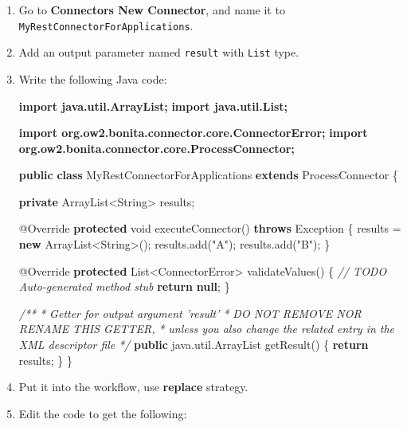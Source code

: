 \documentclass[]{report}
\newenvironment{Shaded}{}{}
\newcommand{\KeywordTok}[1]{\textcolor[rgb]{0.00,0.44,0.13}{\textbf{{#1}}}}
\newcommand{\DataTypeTok}[1]{\textcolor[rgb]{0.56,0.13,0.00}{{#1}}}
\newcommand{\StringTok}[1]{\textcolor[rgb]{0.25,0.44,0.63}{{#1}}}
\newcommand{\CommentTok}[1]{\textcolor[rgb]{0.38,0.63,0.69}{\textit{{#1}}}}
\newcommand{\FunctionTok}[1]{\textcolor[rgb]{0.02,0.16,0.49}{{#1}}}
\newcommand{\NormalTok}[1]{{#1}}
\begin{document}
\begin{enumerate}
\def\labelenumi{\arabic{enumi}.}
\item
  Go to \textbf{Connectors \textbar{} New Connector}, and name it to
  \texttt{MyRestConnectorForApplications}.
\item
  Add an output parameter named \texttt{result} with \texttt{List} type.
\item
  Write the following Java code:

\begin{Shaded}
\begin{Highlighting}[]
\KeywordTok{import java.util.ArrayList;}
\KeywordTok{import java.util.List;}

\KeywordTok{import org.ow2.bonita.connector.core.ConnectorError;}
\KeywordTok{import org.ow2.bonita.connector.core.ProcessConnector;}

\KeywordTok{public} \KeywordTok{class} \NormalTok{MyRestConnectorForApplications }\KeywordTok{extends} \NormalTok{ProcessConnector \{}

  \KeywordTok{private} \NormalTok{ArrayList<String> results;}

  \FunctionTok{@Override}
  \KeywordTok{protected} \DataTypeTok{void} \FunctionTok{executeConnector}\NormalTok{() }\KeywordTok{throws} \NormalTok{Exception \{}
    \NormalTok{results = }\KeywordTok{new} \NormalTok{ArrayList<String>();}
    \NormalTok{results.}\FunctionTok{add}\NormalTok{(}\StringTok{"A"}\NormalTok{);}
    \NormalTok{results.}\FunctionTok{add}\NormalTok{(}\StringTok{"B"}\NormalTok{);}
  \NormalTok{\}}

  \FunctionTok{@Override}
  \KeywordTok{protected} \NormalTok{List<ConnectorError> }\FunctionTok{validateValues}\NormalTok{() \{}
    \CommentTok{// TODO Auto-generated method stub}
    \KeywordTok{return} \KeywordTok{null}\NormalTok{;}
  \NormalTok{\}}

  \CommentTok{/**}
\CommentTok{   * Getter for output argument 'result'}
\CommentTok{   * DO NOT REMOVE NOR RENAME THIS GETTER, }
\CommentTok{   * unless you also change the related entry in the XML descriptor file}
\CommentTok{   */}
  \KeywordTok{public} \NormalTok{java.}\FunctionTok{util}\NormalTok{.}\FunctionTok{ArrayList} \FunctionTok{getResult}\NormalTok{() \{}
    \KeywordTok{return} \NormalTok{results;}
  \NormalTok{\}}
\NormalTok{\}}
\end{Highlighting}
\end{Shaded}
\item
  Put it into the workflow, use \textbf{replace} strategy.
\item
  Edit the code to get the following:


\end{enumerate}
\end{document}
